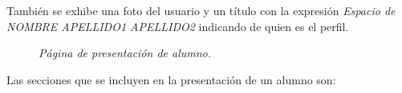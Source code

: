 \documentclass[a4paper, 12pt]{book}
\begin{document}
Tambi\'en se exhibe una foto del usuario y un t\'itulo con la expresi\'on \textit{Espacio de NOMBRE APELLIDO1 APELLIDO2} indicando de quien es el perfil.

\begin{figure}
  \centering
  \caption{\textit{P\'agina de presentaci\'on de alumno.}}
  \label{fig:presentacionalumno}
\end{figure}
  
Las secciones que se incluyen en la presentaci\'on de un alumno son:
\end{document}
